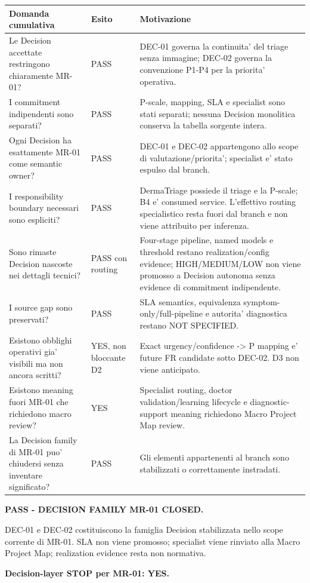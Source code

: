 \documentclass[11pt,a4paper]{article}
\begin{document}
\begin{longtable}{L{58mm}L{24mm}L{75mm}}
\toprule
\textbf{Domanda cumulativa} & \textbf{Esito} & \textbf{Motivazione} \\
\midrule
\endhead
Le Decision accettate restringono chiaramente MR-01? & PASS & DEC-01 governa la continuita' del triage senza immagine; DEC-02 governa la convenzione P1-P4 per la priorita' operativa. \\
I commitment indipendenti sono separati? & PASS & P-scale, mapping, SLA e specialist sono stati separati; nessuna Decision monolitica conserva la tabella sorgente intera. \\
Ogni Decision ha esattamente MR-01 come semantic owner? & PASS & DEC-01 e DEC-02 appartengono allo scope di valutazione/priorita'; specialist e' stato espulso dal branch. \\
I responsibility boundary necessari sono espliciti? & PASS & DermaTriage possiede il triage e la P-scale; B4 e' consumed service. L'effettivo routing specialistico resta fuori dal branch e non viene attribuito per inferenza. \\
Sono rimaste Decision nascoste nei dettagli tecnici? & PASS con routing & Four-stage pipeline, named models e threshold restano realization/config evidence; HIGH/MEDIUM/LOW non viene promosso a Decision autonoma senza evidence di commitment indipendente. \\
I source gap sono preservati? & PASS & SLA semantics, equivalenza symptom-only/full-pipeline e autorita' diagnostica restano NOT SPECIFIED. \\
Esistono obblighi operativi gia' visibili ma non ancora scritti? & YES, non bloccante D2 & Exact urgency/confidence -> P mapping e' future FR candidate sotto DEC-02. D3 non viene anticipato. \\
Esistono meaning fuori MR-01 che richiedono macro review? & YES & Specialist routing, doctor validation/learning lifecycle e diagnostic-support meaning richiedono Macro Project Map review. \\
La Decision family di MR-01 puo' chiudersi senza inventare significato? & PASS & Gli elementi appartenenti al branch sono stabilizzati o correttamente instradati. \\
\bottomrule
\end{longtable}

\begin{ddtacore}[title={D2 cumulative disposition - MR-01}]
\textbf{PASS - DECISION FAMILY MR-01 CLOSED.}\par
DEC-01 e DEC-02 costituiscono la famiglia Decision stabilizzata nello scope corrente di MR-01. SLA non viene promosso; specialist viene rinviato alla Macro Project Map; realization evidence resta non normativa.\par
\textbf{Decision-layer STOP per MR-01: YES.}
\end{ddtacore}
\end{document}
